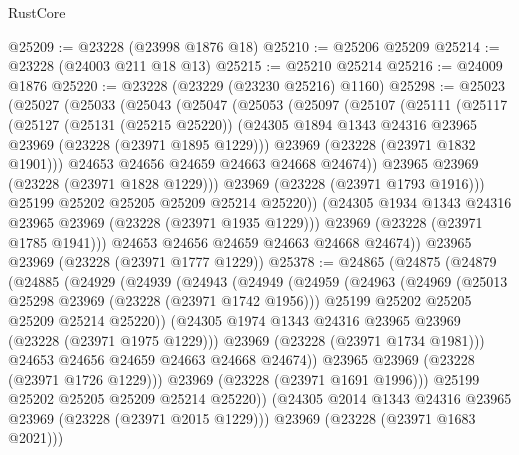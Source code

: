 \begin{lexlean}{RustCore}
\begin{coremodule}
@25209 := @23228 (@23998 @1876 @18)
@25210 := @25206 @25209
@25214 := @23228 (@24003 @211 @18 @13)
@25215 := @25210 @25214
@25216 := @24009 @1876
@25220 := @23228 (@23229 (@23230 @25216) @1160)
@25298 := @25023
    (@25027
      (@25033
        (@25043
          (@25047
            (@25053
              (@25097
                (@25107
                  (@25111
                    (@25117
                      (@25127
                        (@25131 (@25215 @25220))
                        (@24305 @1894 @1343 @24316 @23965 @23969 (@23228 (@23971 @1895 @1229)))
                        @23969
                        (@23228 (@23971 @1832 @1901)))
                      @24653
                      @24656
                      @24659
                      @24663
                      @24668
                      @24674))
                  @23965
                  @23969
                  (@23228 (@23971 @1828 @1229)))
                @23969
                (@23228 (@23971 @1793 @1916)))
              @25199
              @25202
              @25205
              @25209
              @25214
              @25220))
          (@24305 @1934 @1343 @24316 @23965 @23969 (@23228 (@23971 @1935 @1229)))
          @23969
          (@23228 (@23971 @1785 @1941)))
        @24653
        @24656
        @24659
        @24663
        @24668
        @24674))
    @23965
    @23969
    (@23228 (@23971 @1777 @1229))
@25378 := @24865
    (@24875
      (@24879
        (@24885
          (@24929
            (@24939
              (@24943
                (@24949
                  (@24959
                    (@24963
                      (@24969
                        (@25013 @25298 @23969 (@23228 (@23971 @1742 @1956)))
                        @25199
                        @25202
                        @25205
                        @25209
                        @25214
                        @25220))
                    (@24305 @1974 @1343 @24316 @23965 @23969 (@23228 (@23971 @1975 @1229)))
                    @23969
                    (@23228 (@23971 @1734 @1981)))
                  @24653
                  @24656
                  @24659
                  @24663
                  @24668
                  @24674))
              @23965
              @23969
              (@23228 (@23971 @1726 @1229)))
            @23969
            (@23228 (@23971 @1691 @1996)))
          @25199
          @25202
          @25205
          @25209
          @25214
          @25220))
      (@24305 @2014 @1343 @24316 @23965 @23969 (@23228 (@23971 @2015 @1229)))
      @23969
      (@23228 (@23971 @1683 @2021)))

\end{coremodule}
\end{lexlean}
